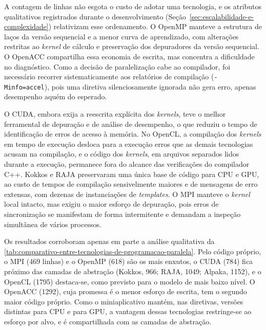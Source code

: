 A contagem de linhas não esgota o custo de adotar uma tecnologia, e os atributos qualitativos registrados durante o desenvolvimento (Seção~\ref{sec:escalabilidade-e-complexidade}) relativizam esse ordenamento.
O OpenMP manteve a estrutura de laços da versão sequencial e a menor curva de aprendizado, com alterações restritas ao \textit{kernel} de cálculo e preservação dos depuradores da versão sequencial.
O OpenACC compartilha essa economia de escrita, mas concentra a dificuldade no diagnóstico.
Como a decisão de paralelização cabe ao compilador, foi necessário recorrer sistematicamente aos relatórios de compilação (\texttt{-Minfo=accel}), pois uma diretiva silenciosamente ignorada não gera erro, apenas desempenho aquém do esperado.

O CUDA, embora exija a reescrita explícita dos \textit{kernels}, teve o melhor ferramental de depuração e de análise de desempenho, o que reduziu o tempo de identificação de erros de acesso à memória.
No OpenCL, a compilação dos \textit{kernels} em tempo de execução desloca para a execução erros que as demais tecnologias acusam na compilação, e o código dos \textit{kernels}, em arquivos separados lidos durante a execução, permanece fora do alcance das verificações do compilador C++.
Kokkos e RAJA preservaram uma única base de código para CPU e GPU, ao custo de tempos de compilação sensivelmente maiores e de mensagens de erro extensas, com dezenas de instanciações de \textit{templates}.
O MPI manteve o \textit{kernel} local intacto, mas exigiu o maior esforço de depuração, pois erros de sincronização se manifestam de forma intermitente e demandam a inspeção simultânea de vários processos.

Os resultados corroboram apenas em parte a análise qualitativa da \autoref{tab:comparativo-entre-tecnologias-de-programacao-paralela}.
Pelo código próprio, o MPI (469 linhas) e o OpenMP (618) são os mais enxutos, o CUDA (784) fica próximo das camadas de abstração (Kokkos, 966; RAJA, 1049; Alpaka, 1152), e o OpenCL (1795) destaca-se, como previsto para o modelo de mais baixo nível.
O OpenACC (1292), cuja promessa é o menor esforço de escrita, tem o segundo maior código próprio.
Como o miniaplicativo mantém, nas diretivas, versões distintas para CPU e para GPU, a vantagem dessas tecnologias restringe-se ao esforço por alvo, e é compartilhada com as camadas de abstração.

